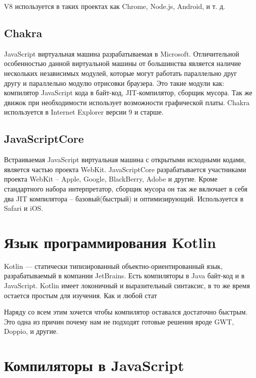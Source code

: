 V8 используется в таких проектах как Chrome, Node.js, Android, и т. д.
\cite{wiki:V8:en, wiki:V8:ru}

\subsection{Chakra}
JavaScript виртуальная машина разрабатываемая в Microsoft. Отличительной особенностью данной виртуальной машины от большинства является наличие нескольких независимых модулей, которые могут работать параллельно друг другу и параллельно модулю отрисовки браузера. Это такие модули как: компилятор JavaScript кода в байт-код, JIT-компилятор, сборщик мусора. Так же движок при необходимости использует возможности графической платы.
Chakra используется в Internet Explorer версии 9 и старше.
\cite{wiki:Chakra:en}

\subsection{JavaScriptCore}

Встраиваемая JavaScript виртуальная машина с открытыми исходными кодами, является частью проекта WebKit. JavaScriptCore разрабатывается участниками проекта WebKit -- Apple, Google, BlackBerry, Adobe и другие. Кроме стандартного набора интерпретатор, сборщик мусора он так же включает в себя два JIT компилятора -- базовый(быстрый) и оптимизирующий.
Используется в Safari и iOS.
\cite{JavaScriptCore}


\section{Язык программирования Kotlin}

Kotlin — статически типизированный объектно-ориентированный язык, разрабатываемый в компании JetBrains.
Есть компиляторы в Java байт-код и в JavaScript.
Kotlin имеет локоничный и выразительный синтаксис, в то же время остается простым для изучения. Как и любой стат

Наряду со всем этим хочется чтобы компилятор оставался достаточно быстрым. Это одна из причин почему нам не подходят готовые решения вроде GWT, Doppio, и другие.

\cite{KotlinOSP}

\section{Компиляторы в JavaScript}

